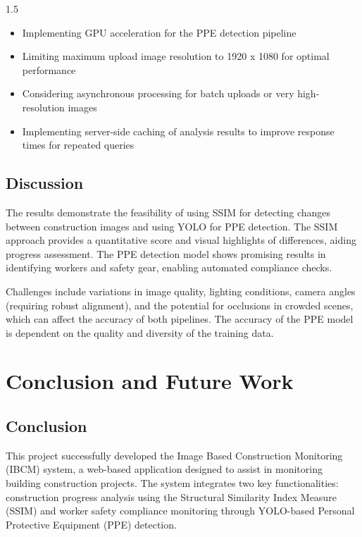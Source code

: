 \documentclass[12pt,a4paper]{report}
\begin{document}
\begin{spacing}{1.5}
    \begin{itemize}
        \item Implementing GPU acceleration for the PPE detection pipeline
        \item Limiting maximum upload image resolution to 1920 x 1080 for optimal performance
        \item Considering asynchronous processing for batch uploads or very high-resolution images
        \item Implementing server-side caching of analysis results to improve response times for repeated queries
    \end{itemize}

    \section{Discussion}
    The results demonstrate the feasibility of using SSIM for detecting changes between construction images and using YOLO for PPE detection. The SSIM approach provides a quantitative score and visual highlights of differences, aiding progress assessment. The PPE detection model shows promising results in identifying workers and safety gear, enabling automated compliance checks.

    Challenges include variations in image quality, lighting conditions, camera angles (requiring robust alignment), and the potential for occlusions in crowded scenes, which can affect the accuracy of both pipelines. The accuracy of the PPE model is dependent on the quality and diversity of the training data.

    \chapter{Conclusion and Future Work}
    \label{chap:conclusion}

    \section{Conclusion}
    This project successfully developed the Image Based Construction Monitoring (IBCM) system, a web-based application designed to assist in monitoring building construction projects. The system integrates two key functionalities: construction progress analysis using the Structural Similarity Index Measure (SSIM) and worker safety compliance monitoring through YOLO-based Personal Protective Equipment (PPE) detection.


\end{spacing}
\end{document}

